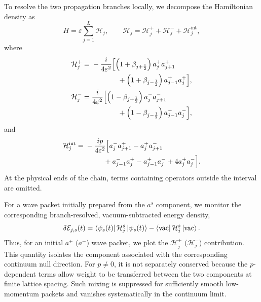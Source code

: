 \documentclass[reprint,amsmath,amssymb,aps,prb,showkeys,superscriptaddress]{revtex4-2}
\begin{document}
To resolve the two propagation branches locally, we decompose the
Hamiltonian density as
\begin{equation}
  H
  =
  \varepsilon\sum_{j=1}^{L}\mathcal{H}_j,
  \qquad
  \mathcal{H}_j
  =
  \mathcal{H}_j^+
  +
  \mathcal{H}_j^-
  +
  \mathcal{H}_j^{\mathrm{int}},
  \label{eq:local_Hamiltonian_decomposition}
\end{equation}
where
\begin{align}
  \mathcal{H}_j^+
  ={}&
  -\frac{i}{4\varepsilon^2}
  \Bigl[
    \left(
      1+\beta_{j+\frac12}
    \right)
    a_j^+a_{j+1}^+
  \nonumber\\
  &\hspace{13mm}
    +
    \left(
      1+\beta_{j-\frac12}
    \right)
    a_{j-1}^+a_j^+
  \Bigr],
  \label{eq:H_density_plus}
  \\
  \mathcal{H}_j^-
  ={}&
  \frac{i}{4\varepsilon^2}
  \Bigl[
    \left(
      1-\beta_{j+\frac12}
    \right)
    a_j^-a_{j+1}^-
  \nonumber\\
  &\hspace{13mm}
    +
    \left(
      1-\beta_{j-\frac12}
    \right)
    a_{j-1}^-a_j^-
  \Bigr],
  \label{eq:H_density_minus}
\end{align}
and
\begin{align}
  \mathcal{H}_j^{\mathrm{int}}
  ={}&
  -\frac{i p}{4\varepsilon^2}
  \Bigl[
    a_j^-a_{j+1}^+
    -
    a_j^+a_{j+1}^-
  \nonumber\\
  &\hspace{9mm}
    +
    a_{j-1}^-a_j^+
    -
    a_{j-1}^+a_j^-
    +
    4a_j^+a_j^-
  \Bigr].
  \label{eq:H_density_interaction}
\end{align}
At the physical ends of the chain, terms containing operators
outside the interval are omitted.

For a wave packet initially prepared from the $a^s$ component, we
monitor the corresponding branch-resolved, vacuum-subtracted energy
density,
\begin{equation}
  \delta\mathcal{E}_{j,s}(t)
  =
  \bra{\psi_s(t)}
  \mathcal{H}_j^s
  \ket{\psi_s(t)}
  -
  \bra{\mathrm{vac}}
  \mathcal{H}_j^s
  \ket{\mathrm{vac}}.
  \label{eq:branch_resolved_energy}
\end{equation}
Thus, for an initial $a^+$ ($a^-$) wave packet, we plot the
$\mathcal{H}_j^+$ ($\mathcal{H}_j^-$) contribution. This quantity
isolates the component associated with the corresponding continuum
null direction. For $p\neq0$, it is not separately conserved
because the $p$-dependent terms allow weight to be transferred
between the two components at finite lattice spacing. Such mixing
is suppressed for sufficiently smooth low-momentum packets and
vanishes systematically in the continuum limit.
\end{document}
